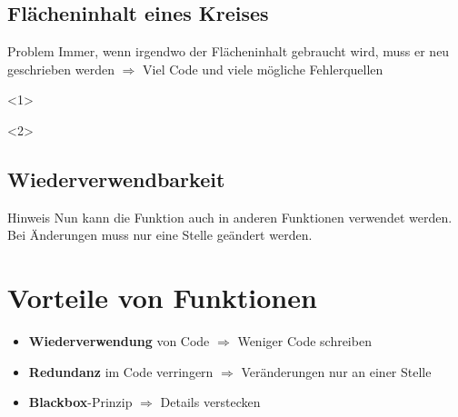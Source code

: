 \subsection{Flächeninhalt eines Kreises}
\begin{frame}
	\slidehead

	\begin{block}{Problem}
		Immer, wenn irgendwo der Flächeninhalt gebraucht wird, muss er neu geschrieben werden $\Rightarrow$ Viel Code und viele mögliche Fehlerquellen
	\end{block}
\end{frame}

\begin{frame}
	\slidehead
	\vspace{-0.2cm}
	\begin{onlyenv}
	\end{onlyenv}

	\begin{onlyenv}
	\end{onlyenv}

\end{frame}

\subsection{Wiederverwendbarkeit}
\begin{frame}
	\slidehead
	\vspace{-0.2cm}
	\vspace{-0.2cm}
	\begin{block}{Hinweis}
		Nun kann die Funktion auch in anderen Funktionen verwendet werden.
		Bei Änderungen muss nur eine Stelle geändert werden.
	\end{block}
\end{frame}

\section{Vorteile von Funktionen}
\begin{frame}
	\slidehead

	\begin{itemize}
		\item \textbf{Wiederverwendung} von Code $\Rightarrow$ Weniger Code schreiben
		\item \textbf{Redundanz} im Code verringern $\Rightarrow$ Veränderungen nur an einer Stelle
		\item \textbf{Blackbox}-Prinzip $\Rightarrow$ Details verstecken
	\end{itemize}
\end{frame}

